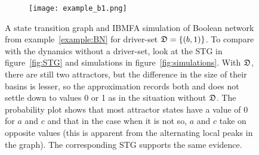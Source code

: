 \documentclass[
	digital, oneside, nosansbold, nocolorbold, nolot, nolof
]{fithesis4}
\theoremstyle{definition}
\theoremstyle{definition}
\DeclarePairedDelimiter{\set}{\{}{\}}
\begin{document}
\begin{figure}[!ht]
\centering
\begin{subfigure}{0.2\textwidth}
    \centering
\end{subfigure}
\hfill
\begin{subfigure}{0.79\textwidth}
    \centering
    \texttt{[image: example\_b1.png]}
\end{subfigure}
\caption{A state transition graph and IBMFA simulation of Boolean network from
    example~\ref{example:BN} for driver-set $\dset{D} = \set{(b, 1)}$.  To
    compare with the dynamics without a driver-set, look at the STG in
    figure~\ref{fig:STG} and simulations in figure~\ref{fig:simulations}. With
    $\mathfrak{D}$, there are still two attractors, but the difference in the size
    of their basins is lesser, so the approximation records both and does not
    settle down to values 0 or 1 as in the situation without $\mathfrak{D}$. The
    probability plot shows that most attractor states have a value of 0 for $a$
    and $c$ and that in the case when it is not so, $a$ and $c$ take on
    opposite values (this is apparent from the alternating local peaks in the
    graph). The corresponding STG supports the same evidence.}
\label{fig:dset_ibmfa}
\end{figure}
\end{document}
